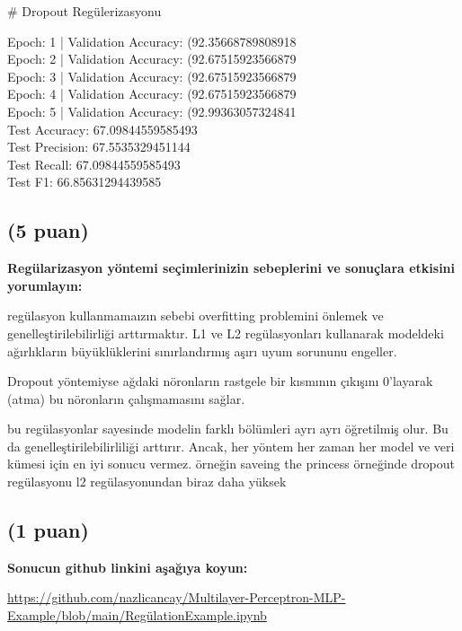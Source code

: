 \documentclass[11pt]{article}
\begin{document}
# Dropout Regülerizasyonu

Epoch: 1 | Validation Accuracy: (92.35668789808918 \\
Epoch: 2 | Validation Accuracy: (92.67515923566879 \\
Epoch: 3 | Validation Accuracy: (92.67515923566879 \\
Epoch: 4 | Validation Accuracy: (92.67515923566879  \\
Epoch: 5 | Validation Accuracy: (92.99363057324841  \\


Test Accuracy: 67.09844559585493 \\
Test Precision: 67.5535329451144 \\
Test Recall: 67.09844559585493 \\
Test F1: 66.85631294439585 \\



\subsection{(5 puan)} \textbf{Regülarizasyon yöntemi seçimlerinizin sebeplerini ve sonuçlara etkisini yorumlayın:}

regülasyon kullanmamaızın sebebi overfitting problemini önlemek ve genelleştirilebilirliği arttırmaktır. L1 ve L2 regülasyonları kullanarak modeldeki ağırlıkların büyüklüklerini sınırlandırmış  aşırı uyum sorununu engeller.

Dropout yöntemiyse ağdaki nöronların rastgele bir kısmının çıkışını 0'layarak (atma) bu nöronların çalışmamasını sağlar. 

bu regülasyonlar sayesinde modelin farklı bölümleri ayrı ayrı öğretilmiş olur. Bu da genelleştirilebilirliliği arttırır. Ancak, her yöntem her zaman her model ve veri kümesi için en iyi sonucu vermez. örneğin saveing the princess örneğinde dropout regülasyonu l2 regülasyonundan biraz daha  yüksek 

\subsection{(1 puan)} \textbf{Sonucun github linkini  aşağıya koyun:}


\url{https://github.com/nazlicancay/Multilayer-Perceptron-MLP-Example/blob/main/RegülationExample.ipynb}\\
\end{document}
